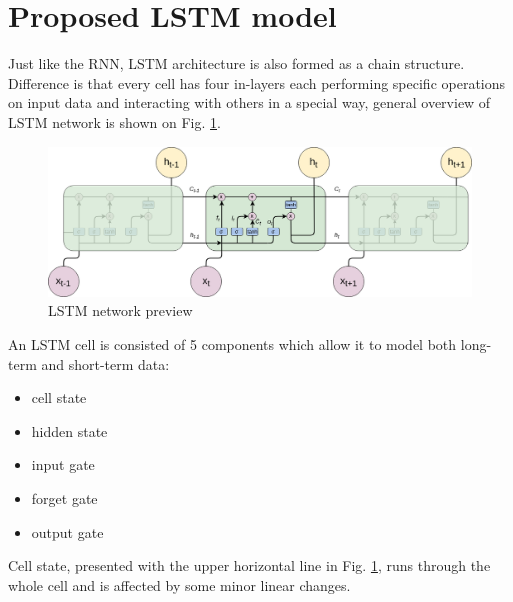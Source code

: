 \documentclass[10pt, a4paper]{article} %
\begin{document}
\section{Proposed LSTM model}

Just like the RNN, LSTM architecture is also formed as a chain structure. Difference is that every cell has four in-layers each performing specific operations on input data and interacting with others in a special way, general overview of LSTM network is shown on Fig. \ref{lstm}.
\begin{figure}
	\centering
	\includegraphics[scale=.4]{images/LSTM.png} %
	\caption{LSTM network preview}
	\label{lstm} 
\end{figure}

An LSTM cell is consisted of 5 components which allow it to model both long-term and short-term data:
\begin{itemize}
	\item cell state
	\item hidden state
	\item input gate 
	\item forget gate
	\item output gate 
\end{itemize}

Cell state, presented with the upper horizontal line in Fig. \ref{lstm}, runs through the whole cell and is affected by some minor linear changes.
\end{document}

